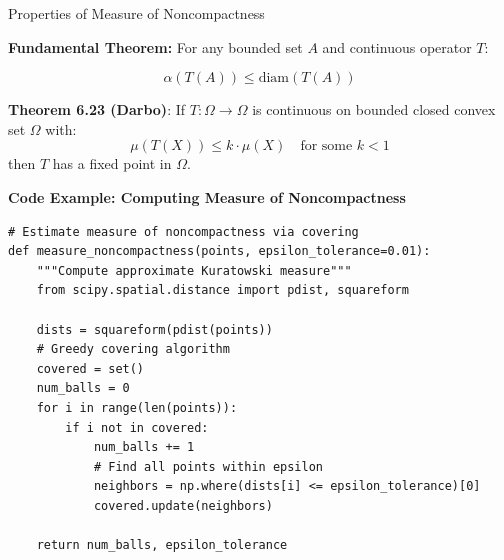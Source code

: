 \documentclass[aspectratio=169,10pt]{beamer}
\begin{document}
\begin{frame}[fragile]{Properties of Measure of Noncompactness}

\textbf{Fundamental Theorem:} For any bounded set $A$ and continuous operator $T$:

\[
\alpha(T(A)) \leq \text{diam}(T(A))
\]

\textbf{Theorem 6.23 (Darbo)}: If $T: \Omega \to \Omega$ is continuous on bounded closed convex set $\Omega$ with:
\[
\mu(T(X)) \leq k \cdot \mu(X) \quad \text{for some } k < 1
\]
then $T$ has a fixed point in $\Omega$.

\vspace{0.5cm}

\textbf{Code Example: Computing Measure of Noncompactness}

\begin{lstlisting}
# Estimate measure of noncompactness via covering
def measure_noncompactness(points, epsilon_tolerance=0.01):
    """Compute approximate Kuratowski measure"""
    from scipy.spatial.distance import pdist, squareform

    dists = squareform(pdist(points))
    # Greedy covering algorithm
    covered = set()
    num_balls = 0
    for i in range(len(points)):
        if i not in covered:
            num_balls += 1
            # Find all points within epsilon
            neighbors = np.where(dists[i] <= epsilon_tolerance)[0]
            covered.update(neighbors)

    return num_balls, epsilon_tolerance
\end{lstlisting}

\end{frame}
\end{document}

